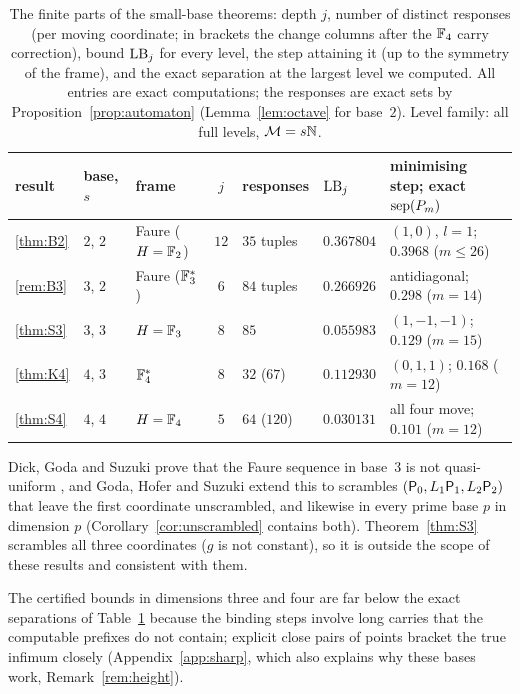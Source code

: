 \begin{table}[t]
\centering
\small
\caption{The finite parts of the small-base theorems: depth $j$, number of distinct responses (per moving coordinate; in brackets the change columns after the $\mathbb{F}_4$ carry correction), bound $\mathrm{LB}_j$ for every level, the step attaining it (up to the symmetry of the frame), and the exact separation at the largest level we computed. All entries are exact computations; the responses are exact sets by Proposition~\ref{prop:automaton} (Lemma~\ref{lem:octave} for base~$2$). Level family: all full levels, $\mathcal{M}=s\mathbb{N}$.}
\label{tab:frames}
\begin{tabular}{@{}lllclll@{}}
\toprule
result & base, $s$ & frame & $j$ & responses & $\mathrm{LB}_j$ & minimising step; exact $\operatorname{sep}(P_m)$\\
\midrule
\ref{thm:B2} & $2$, $2$ & Faure ($H=\mathbb{F}_2$) & $12$ & $35$ tuples & $0.367804$ & $(1,0)$, $l=1$; $0.3968$ ($m\le26$)\\
\ref{rem:B3} & $3$, $2$ & Faure ($\mathbb{F}_3^*$) & $6$ & $84$ tuples & $0.266926$ & antidiagonal; $0.298$ ($m=14$)\\
\ref{thm:S3} & $3$, $3$ & $H=\mathbb{F}_3$ & $8$ & $85$ & $0.055983$ & $(1,-1,-1)$; $0.129$ ($m=15$)\\
\ref{thm:K4} & $4$, $3$ & $\mathbb{F}_4^*$ & $8$ & $32$ ($67$) & $0.112930$ & $(0,1,1)$; $0.168$ ($m=12$)\\
\ref{thm:S4} & $4$, $4$ & $H=\mathbb{F}_4$ & $5$ & $64$ ($120$) & $0.030131$ & all four move; $0.101$ ($m=12$)\\
\bottomrule
\end{tabular}
\end{table}

Dick, Goda and Suzuki prove that the Faure sequence in base~$3$ is not quasi-uniform \cite{DGS2}, and Goda, Hofer and Suzuki extend this to scrambles $(\mathsf{P}_0,L_1\mathsf{P}_1,L_2\mathsf{P}_2)$ that leave the first coordinate unscrambled, and likewise in every prime base $p$ in dimension $p$ \cite[Rem.~3]{GHS26} (Corollary~\ref{cor:unscrambled} contains both). Theorem~\ref{thm:S3} scrambles all three coordinates ($g$ is not constant), so it is outside the scope of these results and consistent with them.

The certified bounds in dimensions three and four are far below the exact separations of Table~\ref{tab:frames} because the binding steps involve long carries that the computable prefixes do not contain; explicit close pairs of points bracket the true infimum closely (Appendix~\ref{app:sharp}, which also explains why these bases work, Remark~\ref{rem:height}).

